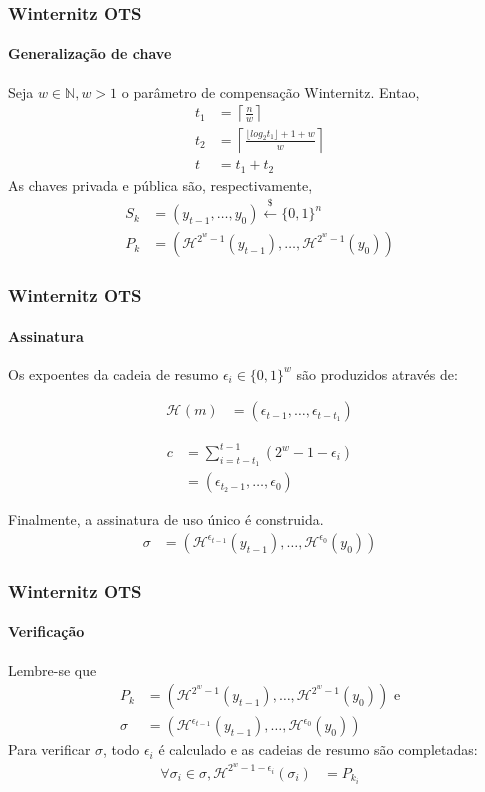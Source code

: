 \documentclass[12pt]{beamer}
\newcommand{\hash}[2][]{\mathcal{H}^{#1}(#2)}
\begin{document}
\begin{frame}
  \frametitle{Winternitz OTS}
  \framesubtitle{Generalização de chave}
  Seja $w \in \mathbb{N}, w > 1$ o parâmetro de compensação Winternitz. Entao,
   \begin{align*}
       t_1 &= \left\lceil \frac{n}{w} \right\rceil \\
       t_2 &= \left\lceil
       \frac{\lfloor log_2 t_1 \rfloor + 1 + w}{w} \right\rceil \\
         t &= t_1 + t_2
   \end{align*}
   As chaves privada e pública são, respectivamente,
   \begin{align*}
     S_k &= (y_{t - 1}, \dots, y_{0})
       \stackrel{\$}{\longleftarrow} \{0,1\}^n \\
     P_k &= (\hash[2^w - 1]{y_{t - 1}}, \dots, \hash[2^w - 1]{y_0})
   \end{align*}
\end{frame}

\begin{frame}
  \frametitle{Winternitz OTS}
  \framesubtitle{Assinatura}
  Os expoentes da cadeia de resumo $\epsilon_i \in \{0, 1\}^w$
  são produzidos através de:
  \begin{minipage}{.45\linewidth}
  \begin{align*}
    \hash{m} &= (\epsilon_{t - 1}, \dots, \epsilon_{t - t_1})
  \end{align*}
  \end{minipage}
  \begin{minipage}{.45\linewidth}
  \begin{align*}
    c &= \sum_{i = t - t_1}^{t - 1} (2^w - 1 - \epsilon_i) \\
      &= (\epsilon_{t_2 - 1}, \dots, \epsilon_{0})
  \end{align*}
  \end{minipage}
  \vspace{4mm}
  
  Finalmente, a assinatura de uso único é construida.
  \begin{align*}
    \sigma &= (\mathcal{H}^{\epsilon_{t - 1}}(y_{t - 1}),
    \dots, \mathcal{H}^{\epsilon_0}(y_0))
  \end{align*}
\end{frame}

\begin{frame}
  \frametitle{Winternitz OTS}
  \framesubtitle{Verificação}
  Lembre-se que
  \begin{align*}
    P_k &= (\hash[2^w - 1]{y_{t - 1}}, \dots, \hash[2^w - 1]{y_0}) \text{ e} \\
    \sigma &= (\mathcal{H}^{\epsilon_{t - 1}}(y_{t - 1}), \dots, \mathcal{H}^{\epsilon_0}(y_0))
  \end{align*}
  Para verificar $\sigma$, todo $\epsilon_i$ é calculado e as cadeias de resumo são completadas:
  \begin{align*}
    \forall \sigma_i \in \sigma,
        \hash[2^w - 1 - \epsilon_{i}]{\sigma_i} &= P_{k_i}
  \end{align*}
\end{frame}
\end{document}
